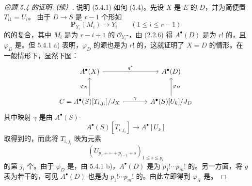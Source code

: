 \begin{proof}[命题 5.4 的证明（续）]
说明 (5.4.1) 如何 (5.4)。先设 $X$ 是 $E$ 的 $D$，并为简便置 $T_{i1}=U_i$。
由于 $D\to S$ 是 $r-1$ 个形如
\[
 \mathbf P_{Y_i}(M_i)\longrightarrow Y_i\qquad(1\le i\le r-1)
\]
的的复合，其中 $M_i$ 是为 $r-i+1$ 的 $\mathscr O_{Y_i}$-，由 (2.2.6) 得 $A^\bullet(D)$ 是为 $r!$ 的，且 $\varphi_D$ 是。但 5.4.1 a) 表明，$\varphi_D$ 的源也是为 $r!$ 的，这就证明了 $X=D$ 的情形。在一般情形下，显然下图：
\[
\begin{tikzcd}[column sep=large,row sep=large]
 A^\bullet(X)\arrow[r,"g^*"]&A^\bullet(D)\\
 C=A^\bullet(S)[T_{i,j_i}]/J_X\arrow[u,"\varphi_X"]\arrow[r,"\gamma"]
 &A^\bullet(S)[U_k]/J_D\arrow[u,"\varphi_D"']
\end{tikzcd}
\]
其中映射 $\gamma$ 是由 $A^\bullet(S)$-
\[
 A^\bullet(S)[T_{i,j_i}]\longrightarrow A^\bullet[U_k]
\]
取得到的，而此将 $T_{i,j_i}$ 映为元素
\[
 (U_{p_1+\cdots+p_{i-1}+s})_{1\le s\le p_i}
\]
的第 $j_i$ 个。由于 $\varphi_D$ 是，由 5.4.1 b)，$A^\bullet(D)$ 是为 $p_1!\cdots p_m!$ 的。另一方面，将 $g$ 表为若干的，可见 $A^\bullet(D)$ 也是为 $p_1!\cdots p_m!$ 的。由此立即得到 $\varphi_X$ 是。
\end{proof}


